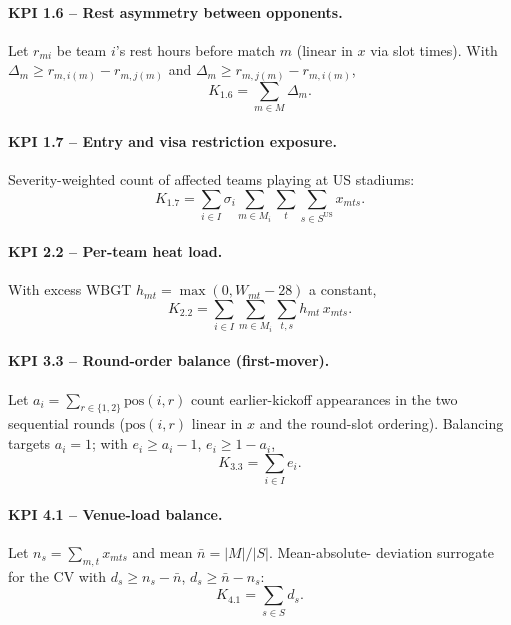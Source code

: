 \paragraph{KPI 1.6 -- Rest asymmetry between opponents.}
Let $r_{mi}$ be team $i$'s rest hours before match $m$ (linear in $x$
via slot times). With $\Delta_m\ge r_{m,i(m)}-r_{m,j(m)}$ and
$\Delta_m\ge r_{m,j(m)}-r_{m,i(m)}$,
\begin{equation}
  K_{1.6}=\sum_{m\in M}\Delta_m .
\end{equation}

\paragraph{KPI 1.7 -- Entry and visa restriction exposure.}
Severity-weighted count of affected teams playing at US stadiums:
\begin{equation}
  K_{1.7}=\sum_{i\in I}\sigma_i
          \sum_{m\in M_i}\sum_{t}\sum_{s\in S^{\mathrm{US}}} x_{mts}.
\end{equation}

\paragraph{KPI 2.2 -- Per-team heat load.}
With excess WBGT $h_{mt}=\max(0,W_{mt}-28)$ a constant,
\begin{equation}
  K_{2.2}=\sum_{i\in I}\sum_{m\in M_i}\sum_{t,s} h_{mt}\,x_{mts}.
\end{equation}

\paragraph{KPI 3.3 -- Round-order balance (first-mover).}
Let $a_i=\sum_{r\in\{1,2\}}\mathrm{pos}(i,r)$ count earlier-kickoff
appearances in the two sequential rounds ($\mathrm{pos}(i,r)$ linear in
$x$ and the round-slot ordering). Balancing targets $a_i=1$; with
$e_i\ge a_i-1$, $e_i\ge 1-a_i$,
\begin{equation}
  K_{3.3}=\sum_{i\in I} e_i .
\end{equation}

\paragraph{KPI 4.1 -- Venue-load balance.}
Let $n_s=\sum_{m,t} x_{mts}$ and mean $\bar n=|M|/|S|$. Mean-absolute-
deviation surrogate for the CV with $d_s\ge n_s-\bar n$,
$d_s\ge \bar n-n_s$:
\begin{equation}
  K_{4.1}=\sum_{s\in S} d_s .
\end{equation}

